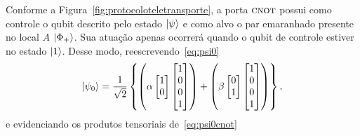 Conforme a Figura~\ref{fig:protocoloteletransporte}, a porta \(\operatorname{\textsc{cnot}}\) possui como controle o qubit descrito pelo estado $\ket{\psi}$ e como alvo o par emaranhado presente no local \(A\) $\ket{\Phi_+}$. Sua atuação apenas ocorrerá quando o qubit de controle estiver no estado $\ket{1}$. Desse modo, reescrevendo~\eqref{eq:psi0}
\begin{equation}\label{eq:psi0cnot}
\ket{\psi_0} = \frac{1}{\sqrt{2}}\left\{\left(\alpha \begin{bmatrix}
1 \\
0 
\end{bmatrix}  \begin{bmatrix}
1 \\
0 \\
0 \\
1
\end{bmatrix}\right) + \left(\beta \begin{bmatrix}
0 \\
1
\end{bmatrix}  \begin{bmatrix}
1 \\
0 \\
0 \\
1
\end{bmatrix}\right) \right\},
\end{equation}
e evidenciando os produtos tensoriais de~\eqref{eq:psi0cnot}
